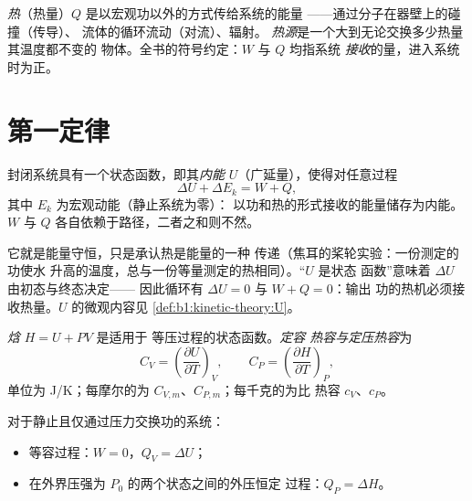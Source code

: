 \begin{definition}[热]\label{def:b1:first-law:heat}
\emph{热}（热量）$Q$ 是以宏观功以外的方式传给系统的能量
——通过分子在器壁上的碰撞（传导）、
流体的循环流动（对流）、辐射。
\emph{热源}是一个大到无论交换多少热量其温度都不变的
物体。全书的符号约定：$W$ 与 $Q$ 均指系统
\emph{接收}的量，进入系统时为正。
\end{definition}

\section{第一定律}

\begin{theorem}[热力学第一定律]\label{thm:b1:first-law:firstlaw}
封闭系统具有一个状态函数，即其\emph{内能}
$U$（广延量），使得对任意过程
\[
\Delta U + \Delta E_{k} = W + Q ,
\]
其中 $E_k$ 为宏观动能（静止系统为零）：
以功和热的形式接收的能量储存为内能。$W$
与 $Q$ 各自依赖于路径，二者之和则不然。
\end{theorem}
\admitted

\begin{remark}[它说的是什么]\label{rem:b1:first-law:meaning}
它就是能量守恒，只是承认热是能量的一种
传递（焦耳的桨轮实验：一份测定的功使水
升高的温度，总与一份等量测定的热相同）。“$U$ 是状态
函数”意味着 $\Delta U$ 由初态与终态决定——
因此循环有 $\Delta U = 0$ 与 $W + Q = 0$：输出
功的热机必须接收热量。$U$ 的微观内容见
\cref{def:b1:kinetic-theory:U}。
\end{remark}

\begin{definition}[焓；热容]\label{def:b1:first-law:enthalpy}
\emph{焓} $H = U + PV$ 是适用于
等压过程的状态函数。\emph{定容
热容与定压热容}为
\[
C_V = \left(\frac{\partial U}{\partial T}\right)_V, \qquad
C_P = \left(\frac{\partial H}{\partial T}\right)_P ,
\]
单位为 \unit{J/K}；每摩尔的为 $C_{V,m}$、$C_{P,m}$；每千克的为比
热容 $c_V$、$c_P$。
\end{definition}

\begin{proposition}[定容热与定压热]\label{prop:b1:first-law:qvqp}
对于静止且仅通过压力交换功的系统：
\begin{itemize}
  \item 等容过程：$W = 0$，$Q_V = \Delta U$；
  \item 在外界压强为 $P_0$ 的两个状态之间的外压恒定
        过程：$Q_P = \Delta H$。
\end{itemize}
\end{proposition}

